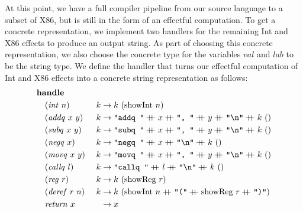 \documentclass[a4paper,UKenglish,cleveref, autoref, thm-restate, anonymous]{oasics-v2021}
\newcommand\append{+\!\!\!\!+~}
\begin{document}
At this point, we have a full compiler pipeline from our source language to a subset of X86, but is still in the form of an effectful computation.
To get a concrete representation, we implement two handlers for the remaining Int and X86 effects to produce an output string.
As part of choosing this concrete representation, we also choose the concrete type for the variables $\mathit{val}$ and $\mathit{lab}$ to be the string type.
We define the handler that turns our effectful computation of Int and X86 effects into a concrete string representation as follows:
\begin{alignat*}{2}
  & \mathbf{handle} && \\
  & \quad(\mathit{int}~n)~&& k \to k~(\mathrm{showInt}~n) \\
  & \quad(\mathit{addq}~x~y)~&& k \to \texttt{"addq "} \append x \append \texttt{", "} \append y \append \texttt{"\textbackslash{}n"} \append k~() \\
  & \quad(\mathit{subq}~x~y)~&& k \to \texttt{"subq "} \append x \append \texttt{", "} \append y \append \texttt{"\textbackslash{}n"} \append k~() \\
  & \quad(\mathit{negq}~x)~&& k \to \texttt{"negq "} \append x \append \texttt{"\textbackslash{}n"} \append k~() \\
  & \quad(\mathit{movq}~x~y)~&& k \to \texttt{"movq "} \append x \append \texttt{", "} \append y \append \texttt{"\textbackslash{}n"} \append k~() \\
  & \quad(\mathit{callq}~l)~&& k \to \texttt{"callq "} \append l \append \texttt{"\textbackslash{}n"} \append k~() \\
  & \quad(\mathit{reg}~r)~&& k \to k~(\mathrm{showReg}~r) \\
  & \quad(\mathit{deref}~r~n)~&& k \to k~(\mathrm{showInt}~n \append \texttt{"("} \append \mathrm{showReg}~r \append \texttt{")"}) \\
  & \quad\mathit{return}~x~&& \hspace{0.55em}\to x 
\end{alignat*}
\end{document}
